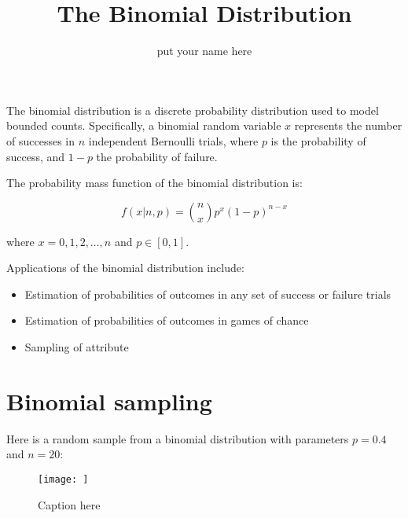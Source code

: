 \documentclass[11pt]{article}  %
\title{The Binomial Distribution}
\author{put your name here}
\begin{document}
	
\maketitle %

The binomial distribution is a discrete probability distribution used to
model bounded counts. Specifically, a binomial random variable $x$ represents
the number of successes in $n$ independent Bernoulli trials, where $p$ is
the probability of success, and $1-p$ the probability of failure.


The probability mass function of the binomial distribution is:

\begin{equation}
	f(x | n,p) = {n \choose x} p^x (1-p)^{n-x} %
\end{equation}

\noindent where $x = 0,1,2,\ldots,n$ and $p \in [0,1]$.

Applications of the binomial distribution include:

\begin{itemize} %

	\item Estimation of probabilities of outcomes in any set of success or failure trials

	\item Estimation of probabilities of outcomes in games of chance

	\item Sampling of attribute

\end{itemize}

\section{Binomial sampling} 

Here is a random sample from a binomial distribution with parameters $p=0.4$ and $n=20$:

\begin{figure}[tb]
    \begin{center}
        \texttt{[image: ]}
    \end{center}
    \caption{Caption here}
    \label{fig:figure1}
\end{figure}
\end{document}
